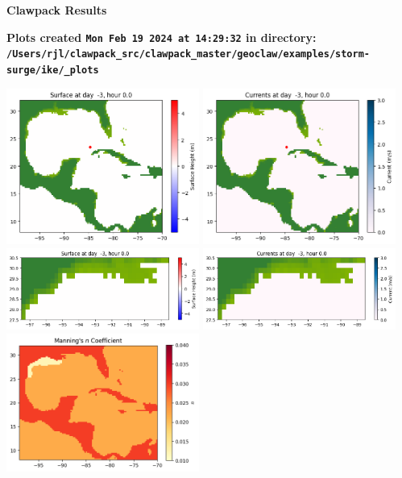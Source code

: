 \documentclass[11pt]{article}
\begin{document}
        \begin{center}{\Large\bf Clawpack Results}\vskip 5pt
        
        \bf Plots created {\tt Mon Feb 19 2024 at 14:29:32} in directory: \vskip 5pt
        \verb+/Users/rjl/clawpack_src/clawpack_master/geoclaw/examples/storm-surge/ike/_plots+
        \end{center}
        \vskip 5pt
        \includegraphics[width=0.475\textwidth]{frame0000fig1001.png}
\includegraphics[width=0.475\textwidth]{frame0000fig1002.png}
\vskip 10pt 
\includegraphics[width=0.475\textwidth]{frame0000fig1003.png}
\includegraphics[width=0.475\textwidth]{frame0000fig1004.png}
\vskip 10pt 
\includegraphics[width=0.475\textwidth]{frame0000fig1005.png}
\end{document}
